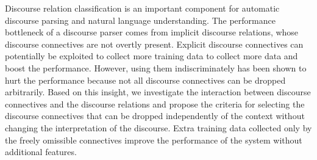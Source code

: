 Discourse relation classification is an important component for automatic discourse parsing and natural language understanding. The performance bottleneck of a discourse parser comes from implicit discourse relations, whose discourse connectives are not overtly present. Explicit discourse connectives can potentially be exploited to collect more training data to collect more data and boost the performance. However, using them indiscriminately has been shown to hurt the performance because not all discourse connectives can be dropped arbitrarily. Based on this insight, we investigate the interaction between discourse connectives and the discourse relations and propose the criteria for selecting the discourse connectives that can be dropped independently of the context without changing the interpretation of the discourse. Extra training data collected only by the freely omissible connectives improve the performance of the system without additional features.
